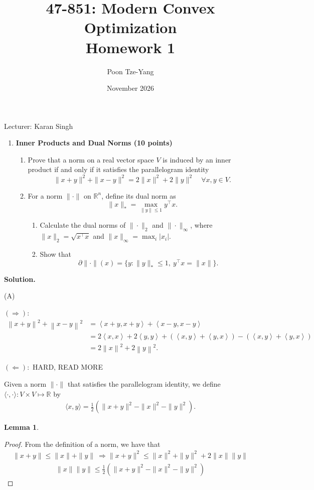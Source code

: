 \documentclass[11pt,letterpaper]{article}
\title{47-851: Modern Convex Optimization \\ Homework 1}
\author{Poon Tze-Yang}
\date{November 2026}
\newtheorem{lemma}[theorem]{Lemma}
\theoremstyle{definition}
\newcommand{\reals}{\mathbb{R}}
\newcommand{\solution}{\medskip\noindent\textbf{Solution.}\par\medskip}
\begin{document}
\maketitle

\noindent Lecturer: Karan Singh

\begin{enumerate}[series=q]
\item \textbf{Inner Products and Dual Norms (10 points)}
\begin{enumerate}[label=\textbf{Part \Alph*.}, leftmargin=*]
\item Prove that a norm on a real vector space $V$ is induced by an inner product if and only if it satisfies the parallelogram identity
\[
\|x + y\|^2 + \|x - y\|^2 = 2\|x\|^2 + 2\|y\|^2 \quad \forall x, y \in V.
\]
\item For a norm $\|\cdot\|$ on $\reals^n$, define its dual norm as
\[
\|x\|_* = \max_{\|y\| \leq 1} y^\top x.
\]
\begin{enumerate}[label=\arabic*.]
\item Calculate the dual norms of $\|\cdot\|_2$ and $\|\cdot\|_\infty$, where $\|x\|_2 = \sqrt{x^\top x}$ and $\|x\|_\infty = \max_i |x_i|$.
\item Show that
\[
\partial \|\cdot\|(x) = \{y : \|y\|_* \leq 1, \ y^\top x = \|x\|\}.
\]
\end{enumerate}
\end{enumerate}
\end{enumerate}

\solution
(A)

$(\Rightarrow):$
\begin{align*}
 \left\| x+y\right\|^2 + \left\|x-y\right\| ^2 & = \left\langle x+y,x+y\right\rangle + \left\langle x-y,x-y\right\rangle \\
 & = 2\left\langle x,x\right\rangle + 2\left\langle y,y\right\rangle + (\left\langle x,y\right\rangle + \left\langle y,x\right\rangle) - (\left\langle x,y\right\rangle + \left\langle y,x\right\rangle) \\
 & = 2\left\|x\right\|^2 + 2\left\|y\right\|^2.
\end{align*}

$(\Leftarrow):$
HARD, READ MORE

Given a norm $\|\cdot\|$ that satisfies the parallelogram identity, we define $\langle\cdot,\cdot\rangle : V\times V \mapsto \reals$ by 
\begin{align*}
    \langle x,y\rangle = \frac{1}{2}\left(\|x+y\|^2 - \|x\|^2 - \|y\|^2\right).
\end{align*}
\begin{lemma}\label{lemma:sandwichNorm}

\end{lemma}
\begin{proof}
    From the definition of a norm, we have that 
    \begin{align*}
        \|x+y\|\leq \|x\|+\|y\| \ \Rightarrow \|x+y\|^2 \leq \|x\|^2 + \|y\|^2 +2\|x\|\|y\|
    \end{align*}
    \begin{align*}
        \|x\|\|y\| \leq \frac{1}{2}(\|x+y\|^2 - \|x\|^2 - \|y\|^2)
    \end{align*}
\end{proof}
\end{document}
